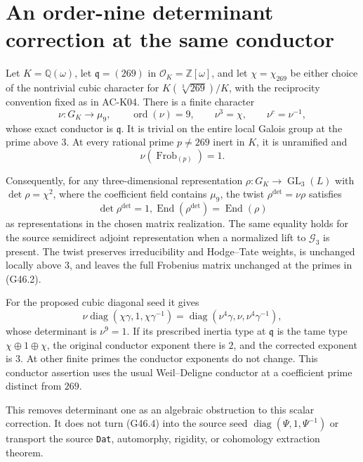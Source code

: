 \section{An order-nine determinant correction at the same conductor}
\label{sec:cubic-determinant-ninth-root}

\begin{proposition}
\label{AC-G46}
Let $K=\mathbb Q(\omega)$, let $\mathfrak q=(269)$ in
$\mathcal O_K=\mathbb Z[\omega]$, and let
$\chi=\chi_{269}$ be either choice of the nontrivial cubic
character for $K(\sqrt[3]{269})/K$, with the reciprocity
convention fixed as in AC-K04.  There is a finite character
\[
 \nu:G_K\longrightarrow\mu_9,
 \qquad \operatorname{ord}(\nu)=9,
 \qquad \nu^3=\chi,\qquad \nu^c=\nu^{-1},             \tag{G46.1}
\]
whose exact conductor is $\mathfrak q$.  It is trivial on the
entire local Galois group at the prime above $3$.  At every
rational prime $p\ne269$ inert in $K$, it is unramified and
\[
                     \nu(\operatorname{Frob}_{(p)})=1. \tag{G46.2}
\]

Consequently, for any three-dimensional representation
$\rho:G_K\to\operatorname{GL}_3(L)$ with
$\det\rho=\chi^2$, where the coefficient field contains
$\mu_9$, the twist $\rho^{\mathrm{det}}=\nu\rho$ satisfies
\[
       \det\rho^{\mathrm{det}}=1,
       \operatorname{End}(\rho^{\mathrm{det}})
                       =\operatorname{End}(\rho)        \tag{G46.3}
\]
as representations in the chosen matrix realization.
The same equality holds for the source semidirect adjoint
representation when a normalized lift to $\mathcal G_3$ is
present.  The twist preserves irreducibility and Hodge--Tate
weights, is unchanged locally above $3$, and leaves the full
Frobenius matrix unchanged at the primes in (G46.2).

For the proposed cubic diagonal seed it gives
\[
 \nu\operatorname{diag}(\chi\gamma,1,\chi\gamma^{-1})
     =\operatorname{diag}(\nu^4\gamma,\nu,
                          \nu^4\gamma^{-1}),            \tag{G46.4}
\]
whose determinant is $\nu^9=1$.
If its prescribed inertia type at $\mathfrak q$ is the tame
type $\chi\oplus1\oplus\chi$, the original conductor
exponent there is $2$, and the corrected exponent is $3$.
At other finite primes the conductor exponents do not change.
This conductor assertion uses the usual Weil--Deligne conductor
at a coefficient prime distinct from $269$.

This removes determinant one as an algebraic obstruction to
this scalar correction.  It does not turn (G46.4) into the
source seed $\operatorname{diag}(\Psi,1,\Psi^{-1})$ or
transport the source \texttt{Dat}, automorphy, rigidity, or
cohomology extraction theorem.
\end{proposition}
